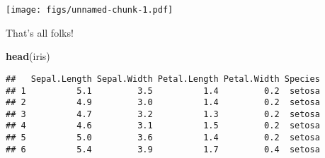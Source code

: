\documentclass[11pt,]{article}
\newenvironment{Shaded}{\begin{snugshade}}{\end{snugshade}}
\newcommand{\KeywordTok}[1]{\textcolor[rgb]{0.13,0.29,0.53}{\textbf{#1}}}
\newcommand{\NormalTok}[1]{#1}
\begin{document}
\texttt{[image: figs/unnamed-chunk-1.pdf]}

That's all folks!

\begin{Shaded}
\begin{Highlighting}[]
\KeywordTok{head}\NormalTok{(iris)}
\end{Highlighting}
\end{Shaded}

\begin{verbatim}
##   Sepal.Length Sepal.Width Petal.Length Petal.Width Species
## 1          5.1         3.5          1.4         0.2  setosa
## 2          4.9         3.0          1.4         0.2  setosa
## 3          4.7         3.2          1.3         0.2  setosa
## 4          4.6         3.1          1.5         0.2  setosa
## 5          5.0         3.6          1.4         0.2  setosa
## 6          5.4         3.9          1.7         0.4  setosa
\end{verbatim}





\newpage
\singlespacing 
\end{document}
